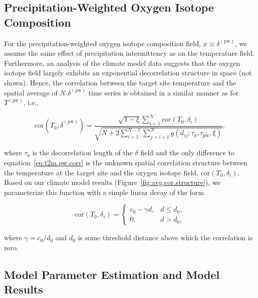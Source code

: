 \documentclass[draft]{agujournal2019}
\begin{document}
\subsection{Precipitation-Weighted Oxygen Isotope Composition}
\label{app:concept.model.oxy.pw}

For the precipitation-weighted oxygen isotope composition field, $x \equiv
\delta^{\mathrm{(pw)}}$, we assume the same effect of precipitation
intermittency as on the temperature field. Furthermore, an analysis of the
climate model data suggests that the oxygen isotope field largely exhibits
an exponential decorrelation structure in space (not shown). Hence, the
correlation between the target site temperature and the spatial average of $N$
$\delta^{\mathrm{(pw)}}$ time series is obtained in a similar manner as for
$T^{\mathrm{(pw)}}$, i.e.,
%
\begin{linenomath*}
\begin{equation}
\label{eq:oxy.pw.corr}
\mathrm{cor}\left(T_0,
  \overline{\delta}^{\mathrm{(pw)}}\right)=
\frac
{\sqrt{1-\xi}\sum_{i=1}^{N}\mathrm{cor}\left(T_0,\delta_i\right)}
{\sqrt{N + 2\sum_{i=1}^{N-1}\sum_{j=i+1}^{N}
  g(d_{ij}; \tau_{\delta}, \tau_{\mathrm{pw}}, \xi)}},
\end{equation}
\end{linenomath*}
%
where $\tau_{\delta}$ is the decorrelation length of the $\delta$ field and the
only difference to equation~\eqref{eq:t2m.pw.corr} is the unknown spatial
correlation structure between the temperature at the target site and the oxygen
isotope field, $\mathrm{cor}\left(T_0,\delta_i\right)$.  Based on our climate
model results (Figure~\ref{fig:avg.cor.structure}), we parameterize this
function with a simple linear decay of the form
%
\begin{linenomath*}
\begin{equation}
\label{eq:t2m.oxy.corr}
\mathrm{cor}\left(T_0,\delta_i\right)=
\begin{cases}
  c_0 - \gamma d, & d \le d_0,\\
  0, & d > d_0,
\end{cases}
\end{equation}
\end{linenomath*}
%
where $\gamma=c_0/d_0$ and $d_0$ is some threshold distance above which
the correlation is zero.

\subsection{Model Parameter Estimation and Model Results}
\label{app:concept.model.estimation}
\end{document}
